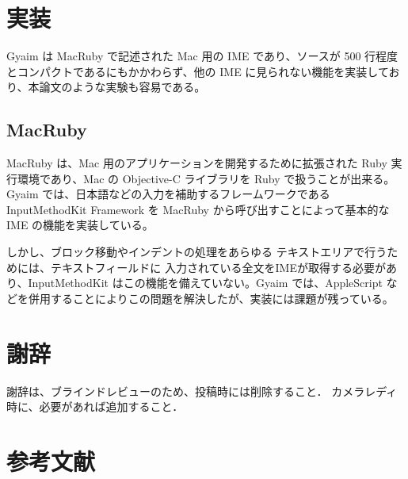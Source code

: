 \documentclass[twoside]{wiss}
\begin{document}
\section{実装}
Gyaim は MacRuby で記述された Mac 用の IME であり、ソースが 500 行程度とコンパクトであるにもかかわらず、他の IME に見られない機能を実装しており、本論文のような実験も容易である。

\subsection{MacRuby}
MacRuby は、Mac 用のアプリケーションを開発するために拡張された Ruby 実行環境であり、Mac の Objective-C ライブラリを Ruby で扱うことが出来る。
Gyaim では、日本語などの入力を補助するフレームワークである InputMethodKit Framework を MacRuby から呼び出すことによって基本的な IME の機能を実装している。

しかし、ブロック移動やインデントの処理をあらゆる テキストエリアで行うためには、テキストフィールドに 入力されている全文をIMEが取得する必要があり、InputMethodKit はこの機能を備えていない。Gyaim では、AppleScript などを併用することによりこの問題を解決したが、実装には課題が残っている。


\section*{謝辞}

謝辞は、ブラインドレビューのため、投稿時には削除すること．
カメラレディ時に、必要があれば追加すること．

\section{参考文献}






\end{document}
